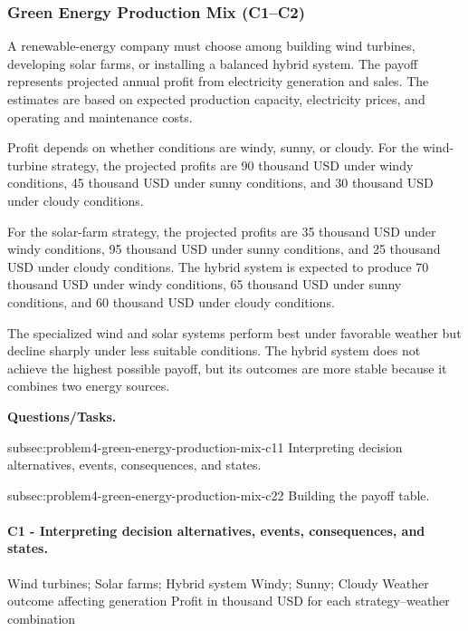 	
	\subsubsection{Green Energy Production Mix (C1--C2)}
	\label{sec:problem4-green-energy-production-mix-c1-c2}
	
	A renewable-energy company must choose among building wind turbines, developing solar farms, or installing a balanced hybrid system. The payoff represents projected annual profit from electricity generation and sales. The estimates are based on expected production capacity, electricity prices, and operating and maintenance costs.
	
	Profit depends on whether conditions are windy, sunny, or cloudy. For the wind-turbine strategy, the projected profits are 90 thousand USD under windy conditions, 45 thousand USD under sunny conditions, and 30 thousand USD under cloudy conditions.
	
	For the solar-farm strategy, the projected profits are 35 thousand USD under windy conditions, 95 thousand USD under sunny conditions, and 25 thousand USD under cloudy conditions. The hybrid system is expected to produce 70 thousand USD under windy conditions, 65 thousand USD under sunny conditions, and 60 thousand USD under cloudy conditions.
	
	The specialized wind and solar systems perform best under favorable weather but decline sharply under less suitable conditions. The hybrid system does not achieve the highest possible payoff, but its outcomes are more stable because it combines two energy sources.

	\textbf{Questions/Tasks.}
	\begin{enumerate}
		\CriterionTask
		{subsec:problem4-green-energy-production-mix-c1}{1}
		{Interpreting decision alternatives, events, consequences, and states.}

		\CriterionTask
		{subsec:problem4-green-energy-production-mix-c2}{2}
		{Building the payoff table.}
	\end{enumerate}

\paragraph*{C1 - Interpreting decision alternatives, events, consequences, and states.}
	\label{subsec:problem4-green-energy-production-mix-c1}
	\DecisionElementsTable
	{Wind turbines; Solar farms; Hybrid system}
	{Windy; Sunny; Cloudy}
	{Weather outcome affecting generation}
	{Profit in thousand USD for each strategy--weather combination}

